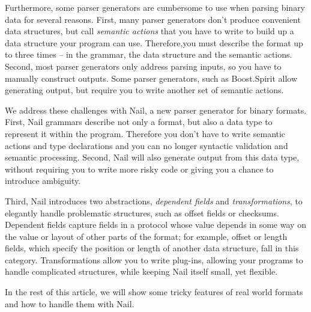 Furthermore, some parser generators are cumbersome to use when parsing binary data for several
reasons. First, many parser generators don't produce convenient data structures, but call
\emph{semantic actions} that you have to write to build up a data structure your program can use. Therefore,you must
describe the format up to three times -- in the grammar, the data structure and the semantic
actions. Second, most parser generators only address parsing inputs, so you have to manually
construct outputs. Some parser generators, such as 
Boost.Spirit  allow generating output, but require you to write another set of semantic actions.


We address these challenges with Nail, a new parser generator for binary formats.
First, Nail grammars describe not only a format, but also a data type to represent it within the program.
Therefore you don't have to write semantic actions and type declarations and you can no longer syntactic validation and semantic processing.
Second, Nail will also generate output from this data type, without requiring you
to write more risky code or giving you a chance to introduce ambiguity.

Third,  Nail introduces two abstractions, \emph{dependent fields} and
\emph{transformations}, to elegantly handle problematic structures,
such as offset fields or checksums.  Dependent fields capture fields
in a protocol whose value depends in some way on the value or layout
of other parts of the format; for example, offset or length fields,
which specify the position or length of another data structure, fall
in this category.  Transformations allow you to write plug-ins, allowing your programs to handle complicated structures, while
keeping Nail itself small, yet flexible. 

In the rest of this article, we will show some tricky features of real world formats and how to
handle them with Nail.



